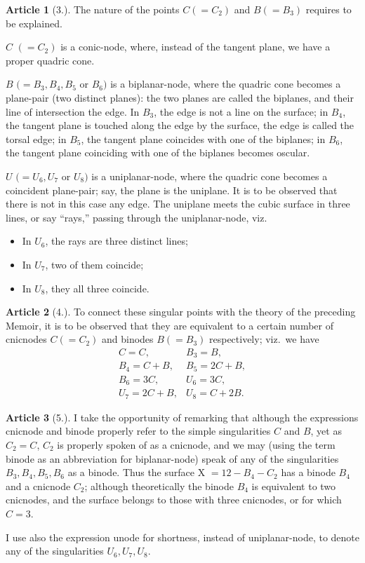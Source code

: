 \documentclass[11pt,a4paper]{article}
\theoremstyle{definition}
\newtheorem{art}{Article}
\begin{document}
\begin{art}[3.]
The nature of the points $C (= C_2)$ and $B (= B_3)$ requires to be explained.

$C$ $(= C_2)$ is a conic-node, where, instead of the tangent plane, we have a proper quadric cone.

$B$ $(= B_3, B_4, B_5$ or $B_6)$ is a biplanar-node, where the quadric cone becomes a plane-pair (two distinct planes): the two planes are called the biplanes, and their line of intersection the edge. In $B_3$, the edge is not a line on the surface; in $B_4$, the tangent plane is touched along the edge by the surface, the edge is called the torsal edge; in $B_5$, the tangent plane coincides with one of the biplanes; in $B_6$, the tangent plane coinciding with one of the biplanes becomes oscular.

$U$ $(= U_6, U_7$ or $U_8)$ is a uniplanar-node, where the quadric cone becomes a coincident plane-pair; say, the plane is the uniplane. It is to be observed that there is not in this case any edge. The uniplane meets the cubic surface in three lines, or say ``rays,'' passing through the uniplanar-node, viz.
\begin{itemize}[noitemsep]
\item In $U_6$, the rays are three distinct lines;
\item In $U_7$, two of them coincide;
\item In $U_8$, they all three coincide.
\end{itemize}
\end{art}

\begin{art}[4.]
To connect these singular points with the theory of the preceding Memoir, it is to be observed that they are equivalent to a certain number of cnicnodes $C (= C_2)$ and binodes $B (= B_3)$ respectively; viz.\ we have
\[
\begin{array}{ll}
C = C, & B_3 = B, \\
B_4 = C + B, & B_5 = 2C + B, \\
B_6 = 3C, & U_6 = 3C, \\
U_7 = 2C + B, & U_8 = C + 2B.
\end{array}
\]
\end{art}

\begin{art}[5.]
I take the opportunity of remarking that although the expressions cnicnode and binode properly refer to the simple singularities $C$ and $B$, yet as $C_2 = C$, $C_2$ is properly spoken of as a cnicnode, and we may (using the term binode as an abbreviation for biplanar-node) speak of any of the singularities $B_3, B_4, B_5, B_6$ as a binode. Thus the surface X $= 12 - B_4 - C_2$ has a binode $B_4$ and a cnicnode $C_2$; although theoretically the binode $B_4$ is equivalent to two cnicnodes, and the surface belongs to those with three cnicnodes, or for which $C = 3$.

I use also the expression unode for shortness, instead of uniplanar-node, to denote any of the singularities $U_6, U_7, U_8$.
\end{art}
\end{document}
